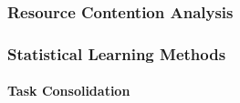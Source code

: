 \subsubsection{Resource Contention Analysis}
\label{sec:resource_contention_analysis}

\subsubsection{Statistical Learning Methods}


\paragraph{Task Consolidation}
\label{sec:evaluation_task_consolidation}

